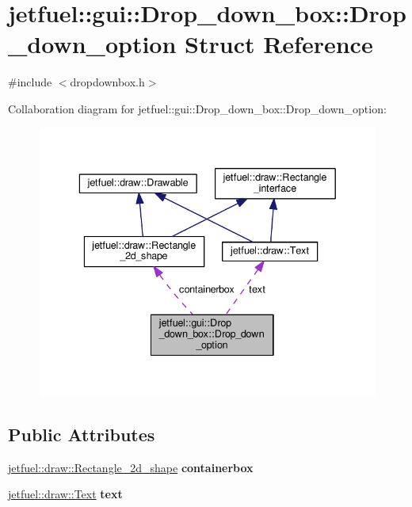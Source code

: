 \hypertarget{structjetfuel_1_1gui_1_1Drop__down__box_1_1Drop__down__option}{}\section{jetfuel\+:\+:gui\+:\+:Drop\+\_\+down\+\_\+box\+:\+:Drop\+\_\+down\+\_\+option Struct Reference}
\label{structjetfuel_1_1gui_1_1Drop__down__box_1_1Drop__down__option}


{\ttfamily \#include $<$dropdownbox.\+h$>$}



Collaboration diagram for jetfuel\+:\+:gui\+:\+:Drop\+\_\+down\+\_\+box\+:\+:Drop\+\_\+down\+\_\+option\+:\nopagebreak
\begin{figure}[H]
\begin{center}
\leavevmode
\includegraphics[width=336pt]{structjetfuel_1_1gui_1_1Drop__down__box_1_1Drop__down__option__coll__graph}
\end{center}
\end{figure}
\subsection*{Public Attributes}
\begin{DoxyCompactItemize}
\item 
\mbox{\label{structjetfuel_1_1gui_1_1Drop__down__box_1_1Drop__down__option_a51183cc19b7ddff4e3fcefe46444b306}} 
\hyperlink{classjetfuel_1_1draw_1_1Rectangle__2d__shape}{jetfuel\+::draw\+::\+Rectangle\+\_\+2d\+\_\+shape} {\bfseries containerbox}
\item 
\mbox{\label{structjetfuel_1_1gui_1_1Drop__down__box_1_1Drop__down__option_aa007a6149c65af3128c930254365c7b5}} 
\hyperlink{classjetfuel_1_1draw_1_1Text}{jetfuel\+::draw\+::\+Text} {\bfseries text}
\end{DoxyCompactItemize}


